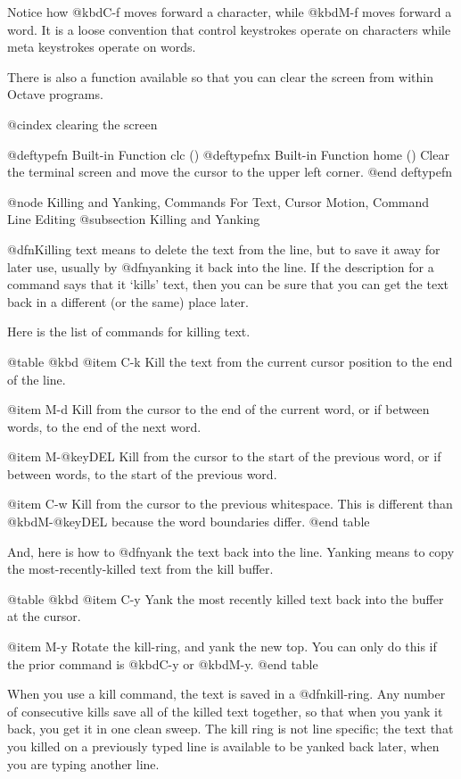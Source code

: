 Notice how @kbd{C-f} moves forward a character, while @kbd{M-f} moves
forward a word.  It is a loose convention that control keystrokes
operate on characters while meta keystrokes operate on words.

There is also a function available so that you can clear the screen from
within Octave programs.

@cindex clearing the screen

@deftypefn {Built-in Function} {} clc ()
@deftypefnx {Built-in Function} {} home ()
Clear the terminal screen and move the cursor to the upper left corner.
@end deftypefn

@node Killing and Yanking, Commands For Text, Cursor Motion, Command Line Editing
@subsection Killing and Yanking

@dfn{Killing} text means to delete the text from the line, but to save
it away for later use, usually by @dfn{yanking} it back into the line.
If the description for a command says that it `kills' text, then you can
be sure that you can get the text back in a different (or the same)
place later.

Here is the list of commands for killing text.

@table @kbd
@item C-k
Kill the text from the current cursor position to the end of the line.

@item M-d
Kill from the cursor to the end of the current word, or if between
words, to the end of the next word.

@item M-@key{DEL}
Kill from the cursor to the start of the previous word, or if between
words, to the start of the previous word. 

@item C-w
Kill from the cursor to the previous whitespace.  This is different than
@kbd{M-@key{DEL}} because the word boundaries differ.
@end table

And, here is how to @dfn{yank} the text back into the line.  Yanking
means to copy the most-recently-killed text from the kill buffer.

@table @kbd
@item C-y
Yank the most recently killed text back into the buffer at the cursor.

@item M-y
Rotate the kill-ring, and yank the new top.  You can only do this if
the prior command is @kbd{C-y} or @kbd{M-y}.
@end table

When you use a kill command, the text is saved in a @dfn{kill-ring}.
Any number of consecutive kills save all of the killed text together, so
that when you yank it back, you get it in one clean sweep.  The kill
ring is not line specific; the text that you killed on a previously
typed line is available to be yanked back later, when you are typing
another line.

